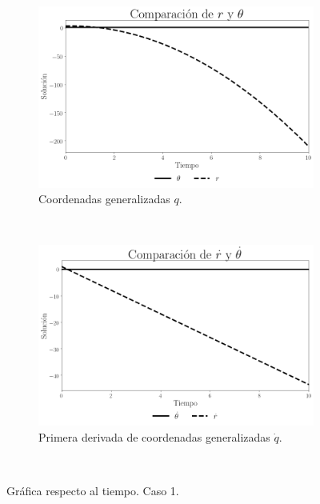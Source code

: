 \documentclass[12pt,letterpaper]{article}
\begin{document}
\begin{figure}
    \centering
    \begin{subfigure}[b]{0.8\textwidth}
        \includegraphics[width=\textwidth]{case03_r_theta}
        \caption{Coordenadas generalizadas $q$.}
        \label{fig:case 3 q lagrange}
    \end{subfigure}
    ~ %
    \begin{subfigure}[b]{0.8\textwidth}
        \includegraphics[width=\textwidth]{case03_d_r_d_theta}
        \caption{Primera derivada de coordenadas generalizadas $\dot q$.}
        \label{fig:case 3 dq lagrange}
    \end{subfigure}
    ~ %
    \caption{Gráfica respecto al tiempo. Caso 1.}\label{fig:case 3 time plot lagrange}
\end{figure}
\end{document}
